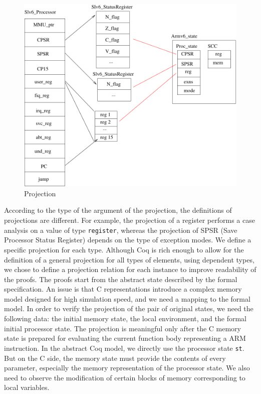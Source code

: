 \documentclass[twocolumn]{article}
\begin{document}
\begin{figure}[h]
\hfil\includegraphics[width=.75\linewidth]{fig/projection.pdf}
\caption{Projection}
\label{fig:proj}
\end{figure}
According to the type of the argument of the projection, the
definitions of projections are different.  For example, the projection
of a register performs a case analysis on a value of type
\texttt{register}, whereas the projection of SPSR (Save Processor
Status Register) depends on the type of exception modes.  We define a
specific projection for each type.  Although Coq is rich enough to
allow for the definition of a general projection for all types of
elements, using dependent types, we chose to define a projection
relation for each instance to improve readability of the proofs.
The proofs start from the abstract state described by the formal
specification.  An issue is that C representations introduce a complex
memory model designed for high simulation speed, and we need a mapping
to the formal model. In order to verify the projection of the pair of
original states, we need the following data: the initial memory state,
the local environment, and the formal initial processor state.  The
projection is meaningful only after the C memory state is prepared for
evaluating the current function body representing a ARM instruction.
In the abstract Coq model, we directly use the processor state
\texttt{st}.  But on the C side, the memory state must provide the
contents of every parameter, especially the memory representation of
the processor state.  We also need to observe the modification of
certain blocks of memory corresponding to local variables.
\end{document}
